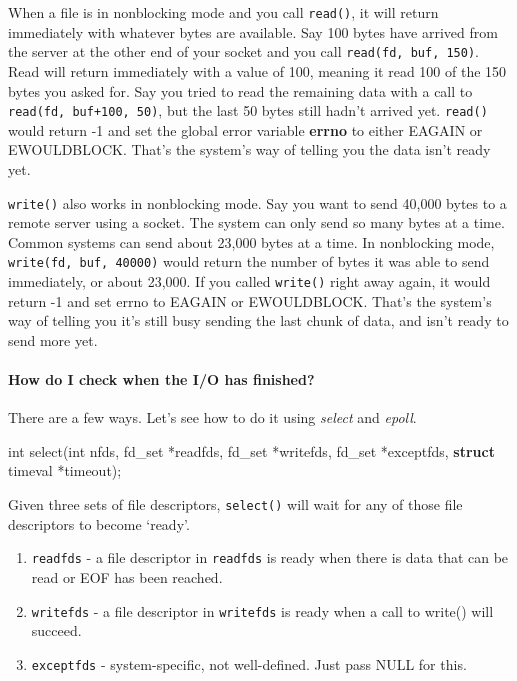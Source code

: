 \documentclass[]{article}
\newenvironment{Shaded}{}{}
\newcommand{\KeywordTok}[1]{\textcolor[rgb]{0.00,0.44,0.13}{\textbf{{#1}}}}
\newcommand{\DataTypeTok}[1]{\textcolor[rgb]{0.56,0.13,0.00}{{#1}}}
\newcommand{\NormalTok}[1]{{#1}}
\let\oldparagraph\paragraph
\renewcommand{\paragraph}[1]{\oldparagraph{#1}\mbox{}}
\begin{document}
When a file is in nonblocking mode and you call \texttt{read()}, it will
return immediately with whatever bytes are available. Say 100 bytes have
arrived from the server at the other end of your socket and you call
\texttt{read(fd,\ buf,\ 150)}. Read will return immediately with a value
of 100, meaning it read 100 of the 150 bytes you asked for. Say you
tried to read the remaining data with a call to
\texttt{read(fd,\ buf+100,\ 50)}, but the last 50 bytes still hadn't
arrived yet. \texttt{read()} would return -1 and set the global error
variable \textbf{errno} to either EAGAIN or EWOULDBLOCK. That's the
system's way of telling you the data isn't ready yet.

\texttt{write()} also works in nonblocking mode. Say you want to send
40,000 bytes to a remote server using a socket. The system can only send
so many bytes at a time. Common systems can send about 23,000 bytes at a
time. In nonblocking mode, \texttt{write(fd,\ buf,\ 40000)} would return
the number of bytes it was able to send immediately, or about 23,000. If
you called \texttt{write()} right away again, it would return -1 and set
errno to EAGAIN or EWOULDBLOCK. That's the system's way of telling you
it's still busy sending the last chunk of data, and isn't ready to send
more yet.

\paragraph{How do I check when the I/O has
finished?}\label{how-do-i-check-when-the-io-has-finished}

There are a few ways. Let's see how to do it using \emph{select} and
\emph{epoll}.

\begin{Shaded}
\begin{Highlighting}[]
\DataTypeTok{int} \NormalTok{select(}\DataTypeTok{int} \NormalTok{nfds, }
           \NormalTok{fd_set *readfds, }
           \NormalTok{fd_set *writefds,}
           \NormalTok{fd_set *exceptfds, }
           \KeywordTok{struct} \NormalTok{timeval *timeout);}
\end{Highlighting}
\end{Shaded}

Given three sets of file descriptors, \texttt{select()} will wait for
any of those file descriptors to become `ready'.

\begin{enumerate}
\item
  \texttt{readfds} - a file descriptor in \texttt{readfds} is ready when
  there is data that can be read or EOF has been reached.
\item
  \texttt{writefds} - a file descriptor in \texttt{writefds} is ready
  when a call to write() will succeed.
\item
  \texttt{exceptfds} - system-specific, not well-defined. Just pass NULL
  for this.
\end{enumerate}
\end{document}
